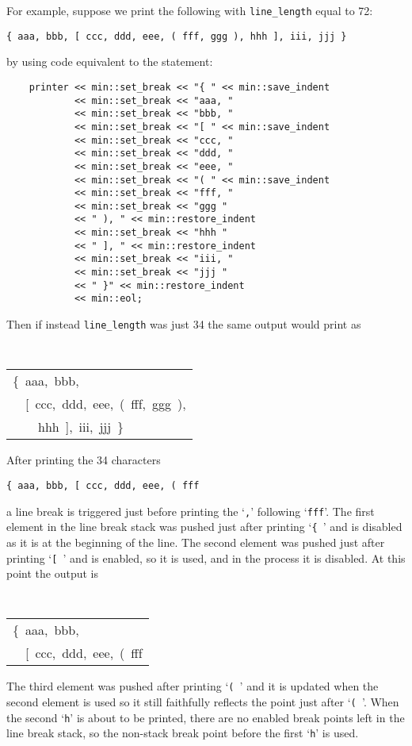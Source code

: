 \documentclass[12pt]{article}
\newcommand{\EOL}{\penalty \exhyphenpenalty}
\newenvironment{indpar}[1][0.3in]%
	{\begin{list}{}%
		     {\setlength{\itemsep}{0in}%
		      \setlength{\topsep}{0in}%
		      \setlength{\parsep}{1ex}%
		      \setlength{\labelwidth}{#1}%
		      \setlength{\leftmargin}{#1}%
		      \addtolength{\leftmargin}{\labelsep}}%
	 \item}%
	{\end{list}}
\begin{document}
For example, suppose we print the following
with {\tt line\_\EOL length} equal to 72:
\begin{center}
\tt \{~aaa,~bbb,~[~ccc,~ddd,~eee,~(~fff,~ggg~),~hhh~],~iii,~jjj~\}
\end{center}
by using code equivalent to the statement:
\begin{indpar}\begin{verbatim}
    printer << min::set_break << "{ " << min::save_indent
            << min::set_break << "aaa, "
            << min::set_break << "bbb, "
            << min::set_break << "[ " << min::save_indent 
            << min::set_break << "ccc, "
            << min::set_break << "ddd, "
            << min::set_break << "eee, "
            << min::set_break << "( " << min::save_indent 
            << min::set_break << "fff, "
            << min::set_break << "ggg "
            << " ), " << min::restore_indent 
            << min::set_break << "hhh "
            << " ], " << min::restore_indent 
            << min::set_break << "iii, "
            << min::set_break << "jjj "
            << " }" << min::restore_indent 
            << min::eol;
\end{verbatim}\end{indpar}
Then if instead {\tt line\_\EOL length} was just 34 the same output would
print as
\begin{center}
\tt
\begin{tabular}{l}
\{~aaa,~bbb, \\
~~[~ccc,~ddd,~eee,~(~fff,~ggg~), \\
~~~~hhh~],~iii,~jjj~\} \\
\end{tabular}
\end{center}

After printing the 34 characters
\begin{center}
\tt \{~aaa,~bbb,~[~ccc,~ddd,~eee,~(~fff
\end{center}
a line break is triggered just before printing the `{\tt ,}' following
`{\tt fff}'.  The first element in the line break stack was pushed
just after printing `{\tt \{~}'%
and is disabled as it is at the beginning of the line.
The second element was pushed just after printing `{\tt [~}' and is
enabled, so it is used, and in the process it is disabled.
At this point the output is
\begin{center}
\tt
\begin{tabular}{l}
\{~aaa,~bbb, \\
~~[~ccc,~ddd,~eee,~(~fff \\
\end{tabular}
\end{center}
The third element was pushed after printing `{\tt (~}' and it
is updated when the second element is used so it still faithfully
reflects the point just after `{\tt (~}'.
When the second `{\tt h}' is about to be printed, there are no
enabled break points left in the line break stack, so the non-stack
break point before the first `{\tt h}' is used.
\end{document}
